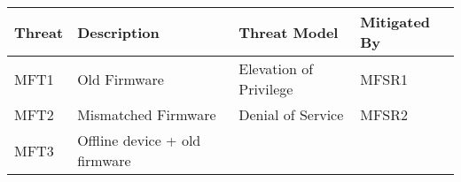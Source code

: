 \begin{longtable}[]{@{}llll@{}}
\toprule
\begin{minipage}[b]{0.05\columnwidth}\raggedright\strut
Threat\strut
\end{minipage} & \begin{minipage}[b]{0.44\columnwidth}\raggedright\strut
Description\strut
\end{minipage} & \begin{minipage}[b]{0.30\columnwidth}\raggedright\strut
Threat Model\strut
\end{minipage} & \begin{minipage}[b]{0.09\columnwidth}\raggedright\strut
Mitigated By\strut
\end{minipage}\tabularnewline
\midrule
\endhead
\begin{minipage}[t]{0.05\columnwidth}\raggedright\strut
MFT1\strut
\end{minipage} & \begin{minipage}[t]{0.44\columnwidth}\raggedright\strut
Old Firmware\strut
\end{minipage} & \begin{minipage}[t]{0.30\columnwidth}\raggedright\strut
Elevation of Privilege\strut
\end{minipage} & \begin{minipage}[t]{0.09\columnwidth}\raggedright\strut
MFSR1\strut
\end{minipage}\tabularnewline
\begin{minipage}[t]{0.05\columnwidth}\raggedright\strut
MFT2\strut
\end{minipage} & \begin{minipage}[t]{0.44\columnwidth}\raggedright\strut
Mismatched Firmware\strut
\end{minipage} & \begin{minipage}[t]{0.30\columnwidth}\raggedright\strut
Denial of Service\strut
\end{minipage} & \begin{minipage}[t]{0.09\columnwidth}\raggedright\strut
MFSR2\strut
\end{minipage}\tabularnewline
\begin{minipage}[t]{0.05\columnwidth}\raggedright\strut
MFT3\strut
\end{minipage} & \begin{minipage}[t]{0.44\columnwidth}\raggedright\strut
Offline device + old firmware\strut
\end{minipage} & \begin{minipage}[t]{0.30\columnwidth}\raggedright\strut

\end{minipage}
\end{longtable}

